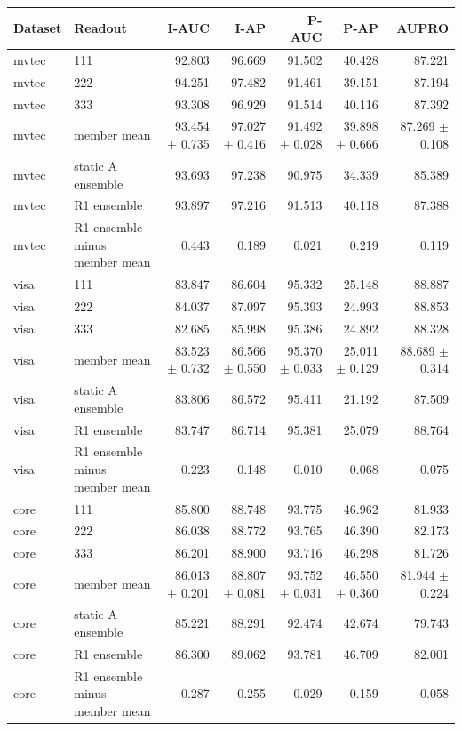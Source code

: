 \begin{tabular}{llrrrrr}
\toprule
Dataset & Readout & I-AUC & I-AP & P-AUC & P-AP & AUPRO \\
\midrule
mvtec & 111 & 92.803 & 96.669 & 91.502 & 40.428 & 87.221 \\
mvtec & 222 & 94.251 & 97.482 & 91.461 & 39.151 & 87.194 \\
mvtec & 333 & 93.308 & 96.929 & 91.514 & 40.116 & 87.392 \\
mvtec & member mean & 93.454 $\pm$ 0.735 & 97.027 $\pm$ 0.416 & 91.492 $\pm$ 0.028 & 39.898 $\pm$ 0.666 & 87.269 $\pm$ 0.108 \\
mvtec & static A ensemble & 93.693 & 97.238 & 90.975 & 34.339 & 85.389 \\
mvtec & R1 ensemble & 93.897 & 97.216 & 91.513 & 40.118 & 87.388 \\
mvtec & R1 ensemble minus member mean & 0.443 & 0.189 & 0.021 & 0.219 & 0.119 \\
visa & 111 & 83.847 & 86.604 & 95.332 & 25.148 & 88.887 \\
visa & 222 & 84.037 & 87.097 & 95.393 & 24.993 & 88.853 \\
visa & 333 & 82.685 & 85.998 & 95.386 & 24.892 & 88.328 \\
visa & member mean & 83.523 $\pm$ 0.732 & 86.566 $\pm$ 0.550 & 95.370 $\pm$ 0.033 & 25.011 $\pm$ 0.129 & 88.689 $\pm$ 0.314 \\
visa & static A ensemble & 83.806 & 86.572 & 95.411 & 21.192 & 87.509 \\
visa & R1 ensemble & 83.747 & 86.714 & 95.381 & 25.079 & 88.764 \\
visa & R1 ensemble minus member mean & 0.223 & 0.148 & 0.010 & 0.068 & 0.075 \\
core & 111 & 85.800 & 88.748 & 93.775 & 46.962 & 81.933 \\
core & 222 & 86.038 & 88.772 & 93.765 & 46.390 & 82.173 \\
core & 333 & 86.201 & 88.900 & 93.716 & 46.298 & 81.726 \\
core & member mean & 86.013 $\pm$ 0.201 & 88.807 $\pm$ 0.081 & 93.752 $\pm$ 0.031 & 46.550 $\pm$ 0.360 & 81.944 $\pm$ 0.224 \\
core & static A ensemble & 85.221 & 88.291 & 92.474 & 42.674 & 79.743 \\
core & R1 ensemble & 86.300 & 89.062 & 93.781 & 46.709 & 82.001 \\
core & R1 ensemble minus member mean & 0.287 & 0.255 & 0.029 & 0.159 & 0.058 \\
\bottomrule
\end{tabular}